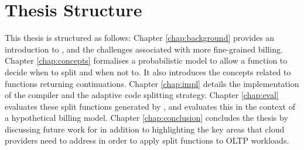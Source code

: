 \section{Thesis Structure}
This thesis is structured as follows: Chapter \ref{chap:background} provides an introduction to \faas{}, and the challenges associated with more fine-grained billing. Chapter \ref{chap:concepts} formalises a probabilistic model to allow a function to decide when to split and when not to. It also introduces the concepts related to functions returning continuations. Chapter \ref{chap:impl} details the implementation of the \faaasc{} compiler and the adaptive code splitting strategy. Chapter \ref{chap:eval} evaluates these split functions generated by \faaasc{}, and evaluates this in the context of a hypothetical billing model. Chapter \ref{chap:conclusion} concludes the thesis by discussing future work for \faaas{} in addition to highlighting the key areas that cloud providers need to address in order to apply \faaas{} split functions to OLTP workloads.
